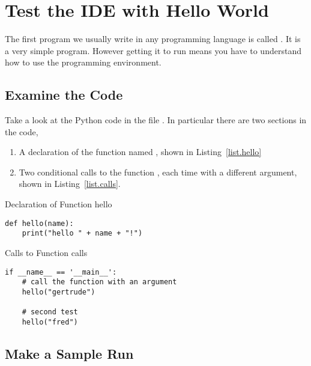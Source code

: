 \section{Test the IDE with Hello World}
\label{sec.hello.world}

The first program we usually write in any programming language is
called .  It is a very simple program.  However
getting it to run means you have to understand how to use the
programming environment.

\subsection{Examine the Code}
\label{sec.examine.the.code}
Take a look at the Python code in the file .  In
particular there are two sections in the code,
\begin{enumerate}
\item A declaration of the function named , shown in
  Listing~\ref{list.hello}
\item Two conditional calls to the function , each time
  with a different argument, shown in Listing~\ref{list.calls}.
\end{enumerate}

\begin{listing}{Declaration of Function }{hello}
\begin{minipage}[c]{0.95\textwidth}\begin{lstlisting}
def hello(name):
    print("hello " + name + "!")
\end{lstlisting}\end{minipage}\end{listing}

\begin{listing}{Calls to Function }{calls}
\begin{minipage}[c]{0.95\textwidth}\begin{lstlisting}
if __name__ == '__main__':
    # call the function with an argument
    hello("gertrude")
    
    # second test
    hello("fred")
\end{lstlisting}\end{minipage}\end{listing}


\subsection{Make a Sample Run}

